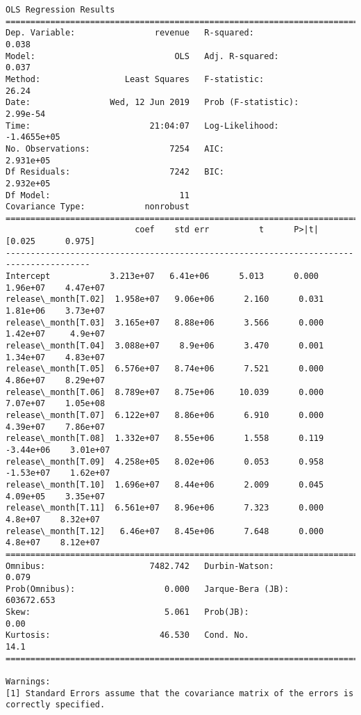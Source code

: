 \documentclass[11pt]{article}
\begin{document}
    \begin{Verbatim}[commandchars=\\\{\}]
                            OLS Regression Results                            
==============================================================================
Dep. Variable:                revenue   R-squared:                       0.038
Model:                            OLS   Adj. R-squared:                  0.037
Method:                 Least Squares   F-statistic:                     26.24
Date:                Wed, 12 Jun 2019   Prob (F-statistic):           2.99e-54
Time:                        21:04:07   Log-Likelihood:            -1.4655e+05
No. Observations:                7254   AIC:                         2.931e+05
Df Residuals:                    7242   BIC:                         2.932e+05
Df Model:                          11                                         
Covariance Type:            nonrobust                                         
=======================================================================================
                          coef    std err          t      P>|t|      [0.025      0.975]
---------------------------------------------------------------------------------------
Intercept            3.213e+07   6.41e+06      5.013      0.000    1.96e+07    4.47e+07
release\_month[T.02]  1.958e+07   9.06e+06      2.160      0.031    1.81e+06    3.73e+07
release\_month[T.03]  3.165e+07   8.88e+06      3.566      0.000    1.42e+07     4.9e+07
release\_month[T.04]  3.088e+07    8.9e+06      3.470      0.001    1.34e+07    4.83e+07
release\_month[T.05]  6.576e+07   8.74e+06      7.521      0.000    4.86e+07    8.29e+07
release\_month[T.06]  8.789e+07   8.75e+06     10.039      0.000    7.07e+07    1.05e+08
release\_month[T.07]  6.122e+07   8.86e+06      6.910      0.000    4.39e+07    7.86e+07
release\_month[T.08]  1.332e+07   8.55e+06      1.558      0.119   -3.44e+06    3.01e+07
release\_month[T.09]  4.258e+05   8.02e+06      0.053      0.958   -1.53e+07    1.62e+07
release\_month[T.10]  1.696e+07   8.44e+06      2.009      0.045    4.09e+05    3.35e+07
release\_month[T.11]  6.561e+07   8.96e+06      7.323      0.000     4.8e+07    8.32e+07
release\_month[T.12]   6.46e+07   8.45e+06      7.648      0.000     4.8e+07    8.12e+07
==============================================================================
Omnibus:                     7482.742   Durbin-Watson:                   0.079
Prob(Omnibus):                  0.000   Jarque-Bera (JB):           603672.653
Skew:                           5.061   Prob(JB):                         0.00
Kurtosis:                      46.530   Cond. No.                         14.1
==============================================================================

Warnings:
[1] Standard Errors assume that the covariance matrix of the errors is correctly specified.

    \end{Verbatim}
\end{document}
